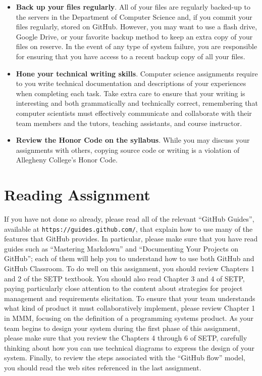 \documentclass[11pt]{article}
\newcommand{\url}[1]{\lstinline{#1}}
\begin{document}
\begin{itemize}
\item {\bf Back up your files regularly}. All of your files are regularly backed-up to the servers in the Department of
  Computer Science and, if you commit your files regularly, stored on GitHub. However, you may want to use a flash
  drive, Google Drive, or your favorite backup method to keep an extra copy of your files on reserve. In the event of
  any type of system failure, you are responsible for ensuring that you have access to a recent backup copy of all your
  files.

\item {\bf Hone your technical writing skills}. Computer science assignments require to you write technical
  documentation and descriptions of your experiences when completing each task. Take extra care to ensure that your
  writing is interesting and both grammatically and technically correct, remembering that computer scientists must
  effectively communicate and collaborate with their team members and the tutors, teaching assistants, and course
  instructor.

\item {\bf Review the Honor Code on the syllabus}. While you may discuss your assignments with others, copying source
  code or writing is a violation of Allegheny College's Honor Code.

\end{itemize}

\vspace*{-1em}

\section*{Reading Assignment}

If you have not done so already, please read all of the relevant ``GitHub Guides'', available at
\url{https://guides.github.com/}, that explain how to use many of the features that GitHub provides. In particular,
please make sure that you have read guides such as ``Mastering Markdown'' and ``Documenting Your Projects on GitHub'';
each of them will help you to understand how to use both GitHub and GitHub Classroom. To do well on this assignment, you
should review Chapters 1 and 2 of the SETP textbook. You should also read Chapter 3 and 4 of SETP, paying particularly
close attention to the content about strategies for project management and requirements elicitation. To ensure that your
team understands what kind of product it must collaboratively implement, please review Chapter 1 in MMM, focusing on the
definition of a programming systems product. As your team begins to design your system during the first phase of this
assignment, please make sure that you review the Chapters 4 through 6 of SETP, carefully thinking about how you can use
technical diagrams to express the design of your system. Finally, to review the steps associated with the ``GitHub
flow'' model, you should read the web sites referenced in the last assignment.
\end{document}
